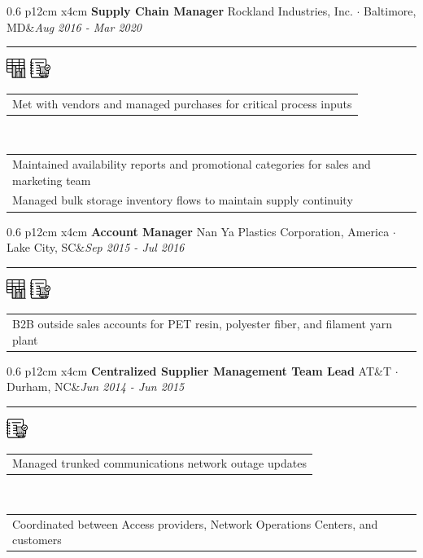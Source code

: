 \documentclass[10pt,A4]{article}
\newcommand{\tzlarrow}{(0,0) -- (0.2,0) -- (0.3,0.2) -- (0.2,0.4) -- (0,0.4) -- (0.1,0.2) -- cycle;}
\newcommand{\larrow}[1]
{\begin{tikzpicture}[scale=0.58]
	 \filldraw[fill=#1!100,draw=#1!100!black]  \tzlarrow
 \end{tikzpicture}
}
\newcommand{\cvevent}[5]
{
\vspace{8pt}
	\begin{tabular*}{0.6\linewidth}{ p{12cm} x{4cm}}
\textbf{#2} \hspace{4pt} {#3}&\textit{#1}\\[4pt]
	\end{tabular*}
        
        \vspace{-6pt}

\textcolor{softcol}{\hrule}
\vspace{-2pt}
\hspace{14.3cm}
#4 \\[-18pt-6pt]
\vspace{6pt}
	\begin{tabular*}{1\textwidth}{l}
	\vspace{-0.85cm} \larrow{sectcol} #5\\[4.5pt]
	\end{tabular*}
}
\newcommand{\cveventshort}[5]
{
\vspace{8pt}
	\begin{tabular*}{0.6\linewidth}{ p{12cm} x{4cm}}
\textbf{#2} \hspace{4pt} {#3}&\textit{#1}\\[4pt]
	\end{tabular*}
        
        \vspace{-6pt}
       
\textcolor{softcol}{\hrule}
\vspace{-2pt}
\hspace{14.3cm}
#4 \\[-18pt-6pt]
\vspace{6pt}
	\begin{tabular*}{1\textwidth}{l}
	\vspace{-0.85cm} \larrow{sectcol} #5\\[6pt]
	\end{tabular*}
\vspace{-3pt}
}
\newcommand{\oneextra}[1]
{ \vspace{-0.85cm+24pt} \\
\begin{tabular*}{1\textwidth}{l}
		 \larrow{softcol}  #1\\[6pt]
	\end{tabular*}
\vspace{-3pt}
}
\newcommand{\twoextra}[2]
{ \vspace{-0.85cm+24pt} \\
\begin{tabular*}{1\textwidth}{l}
		 \larrow{softcol}  #1\\[4.5pt]
		 \larrow{softcol}  #2\\[6pt]
	\end{tabular*}
\vspace{-3pt}
}
\begin{document}
\begin{minipage}[c][0.5\textheight][t]{\linewidth}
{%

%
  \cvevent{Aug 2016 - Mar 2020}{Supply Chain Manager}{Rockland Industries, Inc.  $\cdot$  Baltimore, MD}
{ \hspace{20.2222pt} \includegraphics[height=18pt]{img/chartgraphic} \hspace{2pt} \includegraphics[height=18pt]{img/notebookgraphic}}
{Met with vendors and managed purchases for critical process inputs}
  \twoextra{Maintained availability reports and promotional categories for sales and marketing team}{Managed bulk storage inventory flows to maintain supply continuity}


%
  \cveventshort{Sep 2015 - Jul 2016}{Account Manager}{Nan Ya Plastics Corporation, America  $\cdot$  Lake City, SC}
{ \hspace{20.2222pt} \includegraphics[height=18pt]{img/chartgraphic} \hspace{2pt} \includegraphics[height=18pt]{img/notebookgraphic}}
{B2B outside sales accounts for PET resin, polyester fiber, and filament yarn plant}



%
  \cvevent{Jun 2014 - Jun 2015}{Centralized Supplier Management Team Lead}{AT\&T  $\cdot$  Durham, NC}
{ \hspace{45.2222pt}  \includegraphics[height=18pt]{img/notebookgraphic}}
{Managed trunked communications network outage updates}
  \oneextra{Coordinated between Access providers, Network Operations Centers, and customers}
}

\end{minipage} \\ [24pt]
\end{document}
